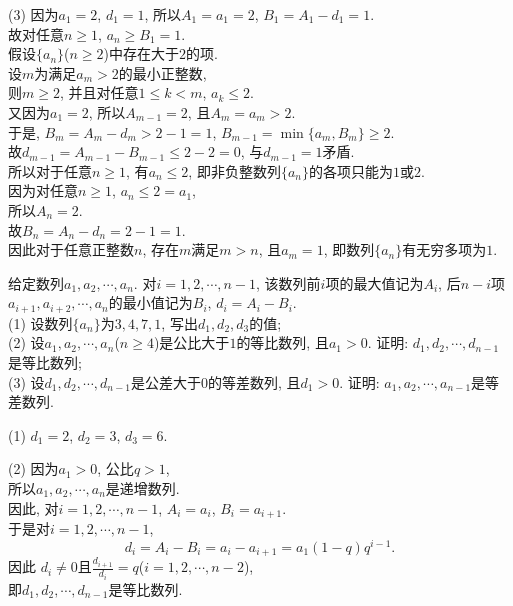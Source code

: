 \documentclass[green]{lsbook}
\begin{document}
(3) 因为$a_1=2$, $d_1=1$, 所以$A_1=a_1=2$, $B_1=A_1-d_1=1$. \\
故对任意$n\geq 1$, $a_n\geq B_1=1$. \\ 
假设$\{a_n\}$($n\geq 2$)中存在大于$2$的项. \\
设$m$为满足$a_m>2$的最小正整数, \\
则$m\geq 2$, 并且对任意$1\leq k<m$, $a_k\leq 2$. \\
又因为$a_1=2$, 所以$A_{m-1}=2$, 且$A_m=a_m>2$. \\
于是, $B_m=A_m-d_m>2-1=1$, $B_{m-1}=\min \{a_m,B_m\}\geq 2$.\\ 
故$d_{m-1}=A_{m-1}-B_{m-1}\leq 2-2=0$, 与$d_{m-1}=1$矛盾. \\
所以对于任意$n\geq 1$, 有$a_n\leq 2$, 即非负整数列$\{a_n\}$的各项只能为$1$或$2$.\\ 
因为对任意$n\geq 1$, $a_n\leq 2=a_1$, \\
所以$A_n=2$. \\
故$B_n=A_n-d_n=2-1=1$.\\ 
因此对于任意正整数$n$, 存在$m$满足$m>n$, 且$a_m=1$, 即数列$\{a_n\}$有无穷多项为$1$. 

\newpage


\begin{tcolorbox}[applelight,title={2013.文20(本小题13分)}]
给定数列$a_1, a_2, \cdots, a_n$. 对$i=1, 2, \cdots, n-1$, 该数列前$i$项的最大值记为$A_i$, 后$n-i$项$a_{i+1}, a_{i+2}, \cdots, a_n$的最小值记为$B_i$, $d_i=A_i-B_i$.\\ 
(1) 设数列$\{a_n\}$为$3, 4, 7, 1$, 写出$d_1,d_2,d_3$的值;\\
(2) 设$a_1, a_2, \cdots, a_n$($n\geq 4$)是公比大于$1$的等比数列, 且$a_1>0$. 证明: $d_1, d_2, \cdots, d_{n-1}$是等比数列;\\
(3) 设$d_1, d_2, \cdots, d_{n-1}$是公差大于$0$的等差数列, 且$d_1>0$. 证明: $a_1, a_2, \cdots, a_{n-1}$是等差数列. 
\end{tcolorbox}


(1) $d_1=2$, $d_2=3$, $d_3=6$.  

(2) 因为$a_1>0$, 公比$q>1$,\\ 
所以$a_1, a_2, \cdots, a_n$是递增数列. \\
因此, 对$i=1, 2, \cdots, n-1$, $A_i=a_i$, $B_i=a_{i+1}$.\\ 
于是对$i=1, 2, \cdots, n-1$,
\[d_i=A_i-B_i=a_i-a_{i+1}=a_1(1-q){{q}^{i-1}}.\] 
因此 $d_i\neq 0$且$\frac{d_{i+1}}{d_i}=q$($i=1,2,\cdots,n-2$),\\ 
即$d_1, d_2, \cdots, d_{n-1}$是等比数列. 
\end{document}
